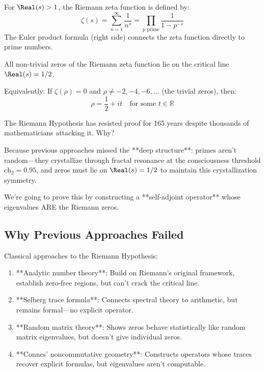 \begin{defn}\label{def:riemann-zeta}
For $\Real(s) > 1$, the Riemann zeta function\cite{riemann1859} is defined by:
\begin{equation}
\zeta(s) = \sum_{n=1}^{\infty} \frac{1}{n^s} = \prod_{p \text{ prime}} \frac{1}{1-p^{-s}}
\end{equation}
The Euler product formula (right side) connects the zeta function directly to prime numbers.
\end{defn}

\begin{theorem}\label{thm:riemann-hypothesis}
All non-trivial zeros of the Riemann zeta function lie on the critical line $\Real(s) = 1/2$.

Equivalently: If $\zeta(\rho) = 0$ and $\rho \neq -2, -4, -6, \ldots$ (the trivial zeros), then:
\begin{equation}
\rho = \frac{1}{2} + it \quad \text{for some } t \in \mathbb{R}
\end{equation}
\end{theorem}

\begin{keyidea}
The Riemann Hypothesis has resisted proof for 165 years despite thousands of mathematicians attacking it. Why?

Because previous approaches missed the **deep structure**: primes aren't random—they crystallize through fractal resonance at the consciousness threshold $\text{ch}_2 = 0.95$, and zeros must lie on $\Real(s) = 1/2$ to maintain this crystallization symmetry.

We're going to prove this by constructing a **self-adjoint operator** whose eigenvalues ARE the Riemann zeros.
\end{keyidea}

\subsection{Why Previous Approaches Failed}

Classical approaches to the Riemann Hypothesis\cite{edwards1974,titchmarsh1986}:

\begin{enumerate}
\item **Analytic number theory**: Build on Riemann's original framework, establish zero-free regions, but can't crack the critical line.

\item **Selberg trace formula**\cite{selberg1956}: Connects spectral theory to arithmetic, but remains formal—no explicit operator.

\item **Random matrix theory**\cite{montgomery1973,odlyzko1987}: Shows zeros behave statistically like random matrix eigenvalues, but doesn't give individual zeros.

\item **Connes' noncommutative geometry**\cite{connes1998}: Constructs operators whose traces recover explicit formulas, but eigenvalues aren't computable.
\end{enumerate}

